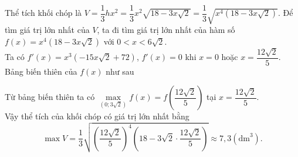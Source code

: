 \begin{ex}
{{}
		\noindent
		Thể tích khối chóp là $V=\dfrac{1}{3} hx^2=\dfrac{1}{3} x^2 \sqrt{18-3x\sqrt{2}}=\dfrac{1}{3}\sqrt{x^4(18-3x\sqrt{2})}$.
		Để tìm giá trị lớn nhất của $V$, ta đi tìm giá trị lớn nhất của hàm số $f(x)=x^4(18-3x\sqrt{2})$ với $0<x<6\sqrt{2}$.\\
		Ta có $f'(x)=x^3\left(-15x\sqrt{2}+72\right)$, $f'(x)=0$ khi $x=0$ hoặc $x=\dfrac{12\sqrt{2}}{5}$.\\
		Bảng biến thiên của $f(x)$ như sau
		\begin{center}
		\end{center}
		Từ bảng biến thiên ta có $\max\limits_{\left(0;3\sqrt{2}\right)}f(x)=f\left(\dfrac{12\sqrt{2}}{5}\right)$ tại $x=\dfrac{12\sqrt{2}}{5}$.\\
		Vậy thể tích của khối chóp có giá trị lớn nhất bằng
		$$\max V=\dfrac{1}{3}\sqrt{\left(\dfrac{12\sqrt{2}}{5}\right)^4\left(18-3\sqrt{2}\cdot \dfrac{12\sqrt{2}}{5}\right)} \approx 7{,}3 \left(\mathrm{dm}^3\right).$$\\
	}
\end{ex}

